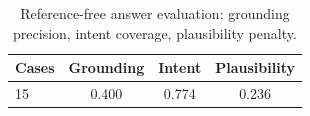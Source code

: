 \begin{table}[h]
  \centering
  \caption{Reference-free answer evaluation: grounding precision, intent coverage, plausibility penalty.}
  \begin{tabular}{lccc}
    \toprule
    Cases & Grounding & Intent & Plausibility \\ \midrule
    15 & 0.400 & 0.774 & 0.236 \\
    \bottomrule
  \end{tabular}
\end{table}
